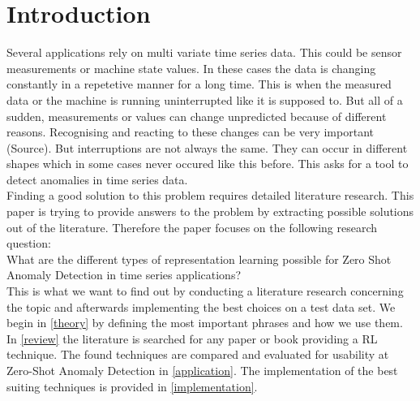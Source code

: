 \chapter{Introduction}\label{intro}
Several applications rely on multi variate time series data. This could be sensor measurements or machine state values. In these cases the data is changing constantly in a repetetive manner for a long time. This is when the measured data or the machine is running uninterrupted like it is supposed to. But all of a sudden, measurements or values can change unpredicted because of different reasons. Recognising and reacting to these changes can be very important (Source). But interruptions are not always the same. They can occur in different shapes which in some cases never occured like this before. This asks for a tool to detect anomalies in time series data.\\
Finding a good solution to this problem requires detailed literature research. This paper is trying to provide answers to the problem by extracting possible solutions out of the literature. Therefore the paper focuses on the following research question:\\
What are the different types of representation learning possible for Zero Shot Anomaly Detection in time series applications?\\
This is what we want to find out by conducting a literature research concerning the topic and afterwards implementing the best choices on a test data set. We begin in \ref{theory} by defining the most important phrases and how we use them. In \ref{review} the literature is searched for any paper or book providing a RL technique. The found techniques are compared and evaluated for usability at Zero-Shot Anomaly Detection in \ref{application}. The implementation of the best suiting techniques is provided in \ref{implementation}.
